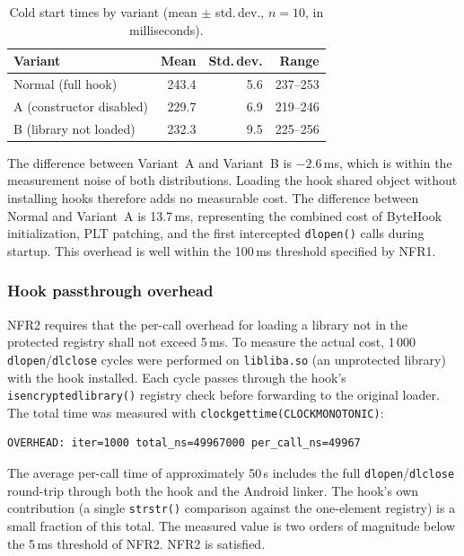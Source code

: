 \documentclass[11pt,a4paper]{report}
\renewcommand\_{{\textunderscore\allowbreak}}
\begin{document}
\begin{table}[h]
\centering
\caption{Cold start times by variant (mean $\pm$ std.\,dev., $n{=}10$, in milliseconds).}
\label{tab:cold_start}
\begin{tabular}{l r r r}
    \hline
    \textbf{Variant} & \textbf{Mean} & \textbf{Std.\,dev.} & \textbf{Range} \\
    \hline
    Normal (full hook)       & 243.4 & 5.6 & 237--253 \\
    A (constructor disabled) & 229.7 & 6.9 & 219--246 \\
    B (library not loaded)   & 232.3 & 9.5 & 225--256 \\
    \hline
\end{tabular}
\end{table}

The difference between Variant~A and Variant~B is $-2.6$\,ms, which is within the measurement noise of both distributions. Loading the hook shared object without installing hooks therefore adds no measurable cost. The difference between Normal and Variant~A is 13.7\,ms, representing the combined cost of ByteHook initialization, PLT patching, and the first intercepted \texttt{dlopen()} calls during startup. This overhead is well within the 100\,ms threshold specified by NFR1.

\subsubsection{Hook passthrough overhead}

NFR2 requires that the per-call overhead for loading a library not in the protected registry shall not exceed 5\,ms. To measure the actual cost, 1\,000 \texttt{dlopen}/\texttt{dlclose} cycles were performed on \texttt{libliba.so} (an unprotected library) with the hook installed. Each cycle passes through the hook's \texttt{is\_encrypted\_library()} registry check before forwarding to the original loader. The total time was measured with \texttt{clock\_gettime(CLOCK\_MONOTONIC)}:

\begin{verbatim}
OVERHEAD: iter=1000 total_ns=49967000 per_call_ns=49967
\end{verbatim}

The average per-call time of approximately 50\,\textmu s includes the full \texttt{dlopen}/\texttt{dlclose} round-trip through both the hook and the Android linker. The hook's own contribution (a single \texttt{strstr()} comparison against the one-element registry) is a small fraction of this total. The measured value is two orders of magnitude below the 5\,ms threshold of NFR2. NFR2 is satisfied.
\end{document}
